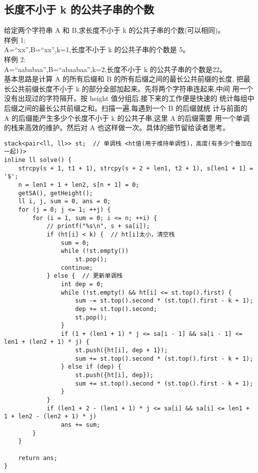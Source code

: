     \subsection{长度不小于 k 的公共子串的个数}
        给定两个字符串 A 和 B,求长度不小于 k 的公共子串的个数(可以相同)。\\
        样例 1:\\
        A=“xx”,B=“xx”,k=1,长度不小于 k 的公共子串的个数是 5。\\
        样例 2:\\
        A=“aababaa”,B=“abaabaa”,k=2,长度不小于 k 的公共子串的个数是22。\\
        基本思路是计算 A 的所有后缀和 B 的所有后缀之间的最长公共前缀的长度,
        把最长公共前缀长度不小于 k 的部分全部加起来。先将两个字符串连起来,中间
        用一个没有出现过的字符隔开。按 height 值分组后,接下来的工作便是快速的
        统计每组中后缀之间的最长公共前缀之和。扫描一遍,每遇到一个 B 的后缀就统
        计与前面的 A 的后缀能产生多少个长度不小于 k 的公共子串,这里 A 的后缀需要
        用一个单调的栈来高效的维护。然后对 A 也这样做一次。具体的细节留给读者思考。
\begin{lstlisting}
stack<pair<ll, ll>> st;  // 单调栈 <ht值(用于维持单调性)，高度(有多少个叠加在一起))>
inline ll solve() {
    strcpy(s + 1, t1 + 1), strcpy(s + 2 + len1, t2 + 1), s[len1 + 1] = '$';
    n = len1 + 1 + len2, s[n + 1] = 0;
    getSA(), getHeight();
    ll i, j, sum = 0, ans = 0;
    for (j = 0; j <= 1; ++j) {
        for (i = 1, sum = 0; i <= n; ++i) {
            // printf("%s\n", s + sa[i]);
            if (ht[i] < k) {  // ht[i]太小，清空栈
                sum = 0;
                while (!st.empty())
                    st.pop();
                continue;
            } else {  // 更新单调栈
                int dep = 0;
                while (!st.empty() && ht[i] <= st.top().first) {
                    sum -= st.top().second * (st.top().first - k + 1);
                    dep += st.top().second;
                    st.pop();
                }
                if (1 + (len1 + 1) * j <= sa[i - 1] && sa[i - 1] <= len1 + (len2 + 1) * j) {
                    st.push({ht[i], dep + 1});
                    sum += st.top().second * (st.top().first - k + 1);
                } else if (dep) {
                    st.push({ht[i], dep});
                    sum += st.top().second * (st.top().first - k + 1);
                }
            }
            if (len1 + 2 - (len1 + 1) * j <= sa[i] && sa[i] <= len1 + 1 + len2 - (len2 + 1) * j)
                ans += sum;
        }
    }

    return ans;
}
\end{lstlisting}


